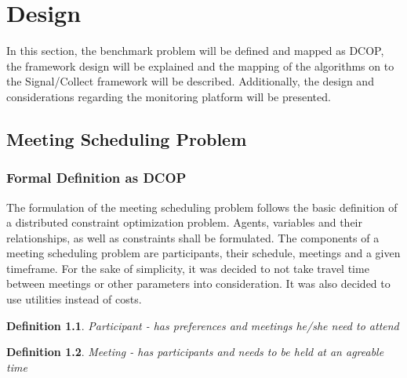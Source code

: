\chapter{Design}

In this section, the benchmark problem will be defined and mapped as DCOP, the framework design will be explained and the mapping of the algorithms on to the Signal/Collect framework will be described. Additionally, the design and considerations regarding the monitoring platform will be presented.

\section{Meeting Scheduling Problem}

\subsection{Formal Definition as DCOP}

The formulation of the meeting scheduling problem follows the basic definition of a distributed constraint optimization problem. Agents, variables and their relationships, as well as constraints shall be formulated. The components of a meeting scheduling problem are participants, their schedule, meetings and a given timeframe. For the sake of simplicity, it was decided to not take travel time between meetings or other parameters into consideration. It was also decided to use utilities instead of costs. %

\theoremstyle{hardconstraint2}
\newtheorem{hardconstraint2}{Definition}
\begin{hardconstraint2}
Participant - has preferences and meetings he/she need to attend
\end{hardconstraint2}
\begin{hardconstraint2}
Meeting - has participants and needs to be held at an agreable time
\end{hardconstraint2}

